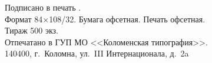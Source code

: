 \vfill
\centering
\begin{minipage}{0.8\tw}
	\small
	\centering
	Подписано в печать \signed.\\
	Формат 84$\times$108/32. Бумага офсетная. Печать офсетная.\\
	Тираж 500 экз.\\ 
	Отпечатано в ГУП МО <<Коломенская типография>>.\\ 140400, г.~Коломна, ул.~III Интернационала, д.~2a
\end{minipage}